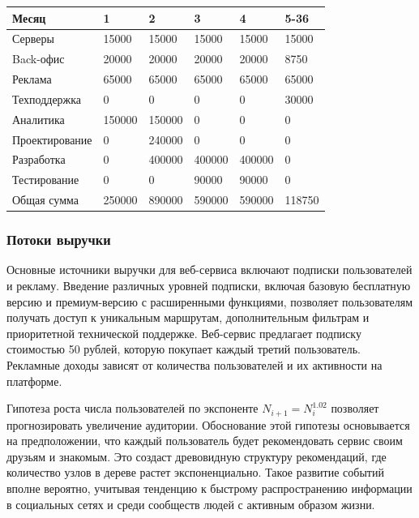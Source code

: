\begin{center}
	\label{tab:fin_model_minus_calc}
	\begin{tabular}{|l|l|l|l|l|l|}
		\hline
		Месяц          & 1      & 2      & 3      & 4      & 5-36   \\ \hline
		Серверы        & 15000  & 15000  & 15000  & 15000  & 15000  \\ \hline
		Back-офис      & 20000  & 20000  & 20000  & 20000  & 8750   \\ \hline
		Реклама        & 65000  & 65000  & 65000  & 65000  & 65000  \\ \hline
		Техподдержка   & 0      & 0      & 0      & 0      & 30000  \\ \hline
		Аналитика      & 150000 & 150000 & 0      & 0      & 0      \\ \hline
		Проектирование & 0      & 240000 & 0      & 0      & 0      \\ \hline
		Разработка     & 0      & 400000 & 400000 & 400000 & 0      \\ \hline
		Тестирование   & 0      & 0      & 90000  & 90000  & 0      \\ \hline
		Общая сумма    & 250000 & 890000 & 590000 & 590000 & 118750 \\ \hline
	\end{tabular}
\end{center}

\subsubsection{Потоки выручки}

Основные источники выручки для веб-сервиса включают подписки пользователей и рекламу. Введение различных уровней подписки, включая базовую бесплатную версию и премиум-версию с расширенными функциями, позволяет пользователям получать доступ к уникальным маршрутам, дополнительным фильтрам и приоритетной технической поддержке. Веб-сервис предлагает подписку стоимостью 50 рублей, которую покупает каждый третий пользователь. Рекламные доходы зависят от количества пользователей и их активности на платформе.

Гипотеза роста числа пользователей по экспоненте $N_{i+1} = N_i^{1.02}$ позволяет прогнозировать увеличение аудитории. Обоснование этой гипотезы основывается на предположении, что каждый пользователь будет рекомендовать сервис своим друзьям и знакомым. Это создаст древовидную структуру рекомендаций, где количество узлов в дереве растет экспоненциально. Такое развитие событий вполне вероятно, учитывая тенденцию к быстрому распространению информации в социальных сетях и среди сообществ людей с активным образом жизни.

